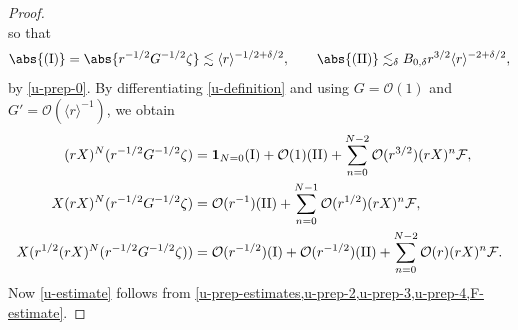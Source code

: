 \documentclass[10pt, reqno]{amsart}
\begin{document}
\begin{proof}
\begin{equation}
\end{equation}
so that
\begin{equation}\label{u-prep-estimates}
\abs{\textnormal{(I)}} = \abs{r^{-1/2}G^{-1/2}\zeta{}}\lesssim \langle{}r\rangle^{-1/2+\delta{}/2},\qquad \abs{\textnormal{(II)}}\lesssim_\delta{} B_{0,\delta{}}r^{3/2}\langle{}r\rangle^{-2+\delta{}/2},
\end{equation}
by \cref{u-prep-0}. By differentiating \cref{u-definition} and using \(G = \mathcal{O}(1)\) and
\(G'=\mathcal{O}(\langle{}r\rangle^{-1})\), we obtain
\begin{align}
(rX)^N(r^{-1/2}G^{-1/2}\zeta{}) &=  \mathbf{1}_{N=0}\textnormal{(I)} + \mathcal{O}(1)\textnormal{(II)} + \sum_{n=0}^{N-2}\mathcal{O}(r^{3/2})(rX)^n\mathcal{F},\label{u-prep-2} \\
X(rX)^N(r^{-1/2}G^{-1/2}\zeta{}) &= \mathcal{O}(r^{-1})\textnormal{(II)} + \sum_{n=0}^{N-1}\mathcal{O}(r^{1/2})(rX)^n\mathcal{F}, \label{u-prep-3} \\
X(r^{1/2}(rX)^N(r^{-1/2}G^{-1/2}\zeta{})) &= \mathcal{O}(r^{-1/2})\textnormal{(I)} + \mathcal{O}(r^{-1/2})\textnormal{(II)} + \sum_{n=0}^{N-2}\mathcal{O}(r)(rX)^n\mathcal{F}. \label{u-prep-4}
\end{align}
Now \cref{u-estimate} follows from
\cref{u-prep-estimates,u-prep-2,u-prep-3,u-prep-4,F-estimate}.
\end{proof}
\end{document}
